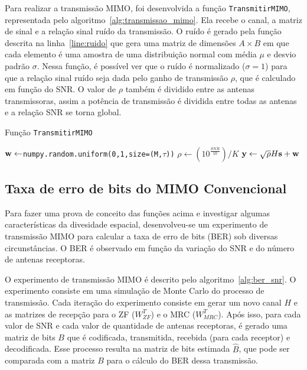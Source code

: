 \documentclass{article}
\begin{document}
Para realizar a transmissão MIMO, foi desenvolvida a função \texttt{TransmitirMIMO}, representada pelo algoritmo~\ref{alg:transmissao_mimo}. Ela recebe o canal, a matriz de sinal e a relação sinal ruído da transmissão. O ruído é gerado pela função descrita na linha~\ref{line:ruido} que gera uma matriz de dimensões $A\times B$ em que cada elemento é uma amostra de uma distribuição normal com média $\mu$ e desvio padrão $\sigma$. Nessa função, é possível ver que o ruído é normalizado ($\sigma=1$) para que a relação sinal ruído seja dada pelo ganho de transmissão $\rho$, que é calculado em função do SNR. O valor de $\rho$ também é dividido entre as antenas transmissoras, assim a potência de transmissão é dividida entre todas as antenas e a relação SNR se torna global. 

\begin{algorithm}
    \label{alg:transmissao_mimo}
    \caption{Função \texttt{TransmitirMIMO}}
    \KwResult{$\ybf$}
    $\mathbf{w} \gets $\texttt{numpy.random.uniform(0,1,size=(M,$\tau$))}\; \label{line:ruido}
    $\rho \gets (10^{\frac{SNR}{10}})/K$\;
    $\mathbf{y} \gets \sqrt{\rho}H\mathbf{s}+\mathbf{w}$\;
\end{algorithm}

\subsection{Taxa de erro de bits do MIMO Convencional}

Para fazer uma prova de conceito das funções acima e investigar algumas características da divesidade espacial, desenvolveu-se um experimento de transmissão MIMO para calcular a taxa de erro de bits (BER) sob diversas circunstâncias. O BER é observado em função da variação do SNR e do número de antenas receptoras. 

O experimento de transmissão MIMO é descrito pelo algoritmo~\ref{alg:ber_snr}. O experimento consiste em uma simulação de Monte Carlo do processo de transmissão. Cada iteração do experimento consiste em gerar um novo canal $H$ e as matrizes de recepção para o ZF ($W^T_{ZF}$) e o MRC ($W^T_{MRC}$). Após isso, para cada valor de SNR e cada valor de quantidade de antenas receptoras, é gerado uma matriz de bits $B$ que é codificada, transmitida, recebida (para cada receptor) e decodificada. Esse processo resulta na matriz de bits estimada $\hat{B}$, que pode ser comparada com a matriz $B$ para o cálculo do BER dessa transmissão. 
\end{document}
